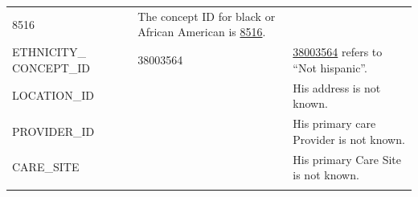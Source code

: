 \documentclass[11pt]{book}
\theoremstyle{definition}
\theoremstyle{definition}
\theoremstyle{definition}
\theoremstyle{remark}
\begin{document}
\begin{longtable}[]{@{}lll@{}}
\begin{minipage}[t]{0.16\columnwidth}
8516\strut
\end{minipage} & \begin{minipage}[t]{0.48\columnwidth}\raggedright\strut
The concept ID for black or African American is
\href{http://athena.ohdsi.org/search-terms/terms/8516}{8516}.\strut
\end{minipage}\tabularnewline
\begin{minipage}[t]{0.28\columnwidth}\raggedright\strut
ETHNICITY\_ CONCEPT\_ID\strut
\end{minipage} & \begin{minipage}[t]{0.16\columnwidth}\raggedright\strut
38003564\strut
\end{minipage} & \begin{minipage}[t]{0.48\columnwidth}\raggedright\strut
\href{http://athena.ohdsi.org/search-terms/terms/38003564}{38003564}
refers to ``Not hispanic''.\strut
\end{minipage}\tabularnewline
\begin{minipage}[t]{0.28\columnwidth}\raggedright\strut
LOCATION\_ID\strut
\end{minipage} & \begin{minipage}[t]{0.16\columnwidth}\raggedright\strut
\strut
\end{minipage} & \begin{minipage}[t]{0.48\columnwidth}\raggedright\strut
His address is not known.\strut
\end{minipage}\tabularnewline
\begin{minipage}[t]{0.28\columnwidth}\raggedright\strut
PROVIDER\_ID\strut
\end{minipage} & \begin{minipage}[t]{0.16\columnwidth}\raggedright\strut
\strut
\end{minipage} & \begin{minipage}[t]{0.48\columnwidth}\raggedright\strut
His primary care Provider is not known.\strut
\end{minipage}\tabularnewline
\begin{minipage}[t]{0.28\columnwidth}\raggedright\strut
CARE\_SITE\strut
\end{minipage} & \begin{minipage}[t]{0.16\columnwidth}\raggedright\strut
\strut
\end{minipage} & \begin{minipage}[t]{0.48\columnwidth}\raggedright\strut
His primary Care Site is not known.\strut
\end{minipage}\tabularnewline
\begin{minipage}[t]{0.28\columnwidth}\raggedright\strut

\end{minipage}
\end{longtable}
\end{document}
